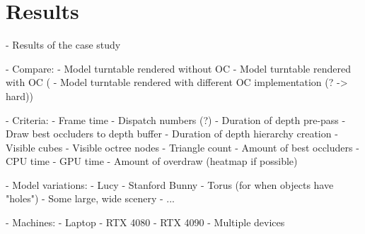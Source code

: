 \chapter{Results} \label{cpt-results}

- Results of the case study


- Compare:
    - Model turntable rendered without OC
    - Model turntable rendered with OC
(   - Model turntable rendered with different OC implementation (? -> hard))


- Criteria: 
    - Frame time
    - Dispatch numbers (?)
    - Duration of depth pre-pass
        - Draw best occluders to depth buffer
        - Duration of depth hierarchy creation
    - Visible cubes
    - Visible octree nodes
    - Triangle count
    - Amount of best occluders
    - CPU time
    - GPU time
    - Amount of overdraw (heatmap if possible)


- Model variations:
    - Lucy
    - Stanford Bunny
    - Torus (for when objects have "holes")
    - Some large, wide scenery
    - ...


- Machines:
    - Laptop
    - RTX 4080
    - RTX 4090
    - Multiple devices